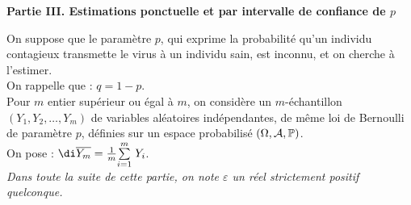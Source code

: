 \documentclass[11pt]{article}%
\begin{document}
\begin{center}\textbf{Partie III. Estimations ponctuelle et par
intervalle de
confiance de $p$}\end{center}

\n On suppose que le paramètre $p$, qui exprime la probabilité qu'un
individu contagieux transmette le virus à un individu sain, est
inconnu,
et on cherche à l'estimer. \\

\n On rappelle que : $q = 1-p$.\\

\n Pour $m$ entier supérieur ou égal à $m$, on considère un
$m$-échantillon $\left( Y_{1},Y_{2},\dots,Y_{m}\right) $ de variables
aléatoires indépendantes, de même loi de Bernoulli de paramètre $p$,
définies sur un espace probabilisé $\left(
\Omega,\mathcal{A},\mathbb{P}\right) $.\\

\n On pose : $\di\overline{Y_{m}} = \frac{1}{m}\Sum{i = 1}{m}Y_{i}$.\\

\n \textit{Dans toute la suite de cette partie, on note $\varepsilon $
un réel
strictement positif quelconque.}
\end{document}
